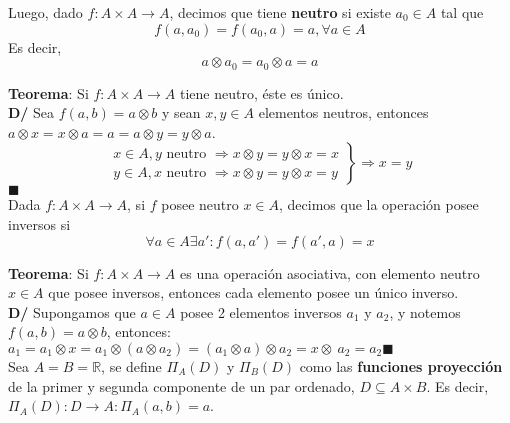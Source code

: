 \documentclass[11pt,a4paper]{article}
\newcommand*{\QEDA}{\null\nobreak\hfill\ensuremath{\blacksquare}}
\begin{document}
\noindent Luego, dado $f : A \times A \rightarrow A$, decimos que tiene \textbf{neutro} si existe $a_0 \in A$ tal que $$f(a, a_0) = f(a_0, a) = a, \forall a \in A$$
\noindent Es decir, $$a \otimes a_0 = a_0 \otimes a = a$$

\noindent \textbf{Teorema}: Si $f : A \times A \rightarrow A$ tiene neutro, \'este es \'unico.\\
\textbf{D/} Sea $f(a,b) = a \otimes b$ y sean $x,y \in A$ elementos neutros, entonces $a \otimes x = x \otimes a = a = a \otimes y = y \otimes a$.
\[ \left. \begin{array}{l}
x \in A, y \text{ neutro } \Rightarrow x \otimes y = y \otimes x = x\\
y \in A, x \text{ neutro } \Rightarrow x \otimes y = y \otimes x = y
\end{array} \right\} \Rightarrow x = y\]  \QEDA\\

\noindent Dada $f : A \times A \rightarrow A$, si $f$ posee neutro $x \in A$, decimos que la operaci\'on posee inversos si $$\forall a \in A \exists a' : f(a, a') = f(a', a) = x$$

\noindent \textbf{Teorema}: Si $f : A \times A \rightarrow A$ es una operaci\'on asociativa, con elemento neutro $x \in A$ que posee inversos, entonces cada elemento posee un \'unico inverso.\\
\textbf{D/} Supongamos que $a \in A$ posee 2 elementos inversos $a_1$ y $a_2$, y notemos $f(a,b) = a \otimes b$, entonces: \\ $a_1 = a_1 \otimes x = a_1 \otimes (a \otimes a_2) = (a_1 \otimes a) \otimes a_2 = x \otimes\ a_2 = a_2$\QEDA\\

\noindent Sea $A = B = \mathbb{R}$, se define $\Pi_A(D)$ y $\Pi_B(D)$ como las \textbf{funciones proyecci\'on} de la primer y segunda componente de un par ordenado, $D \subseteq A \times B$. Es decir, $\Pi_A(D) : D \rightarrow A : \Pi_A(a,b) = a$.
\end{document}

